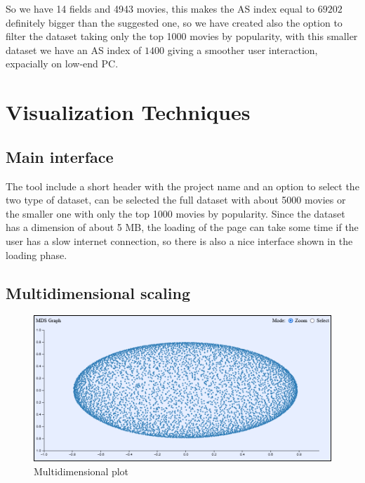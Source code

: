 \documentclass[]{article}
\begin{document}
So we have 14 fields and 4943 movies, this makes the AS index equal to $69202$ definitely bigger than the suggested one, so we have created also the option to filter the dataset taking only the top 1000 movies by popularity, with this smaller dataset we have an AS index of $1400$ giving a smoother user interaction, expacially on low-end PC.\newline
\section{Visualization Techniques}
\subsection{Main interface}
The tool include a short header with the project name and an option to select the two type of dataset, can be selected the full dataset with about 5000 movies or the smaller one with only the top 1000 movies by popularity.\newline
Since the dataset has a dimension of about 5 MB, the loading of the page can take some time if the user has a slow internet connection, so there is also a nice interface shown in the loading phase.
\subsection{Multidimensional scaling}
\begin{figure}[h!]
	\centering
	\includegraphics[width=1\linewidth]{images/mds_plot}
	\caption{Multidimensional plot}
	\label{fig:mdsplot}
\end{figure}
\end{document}

